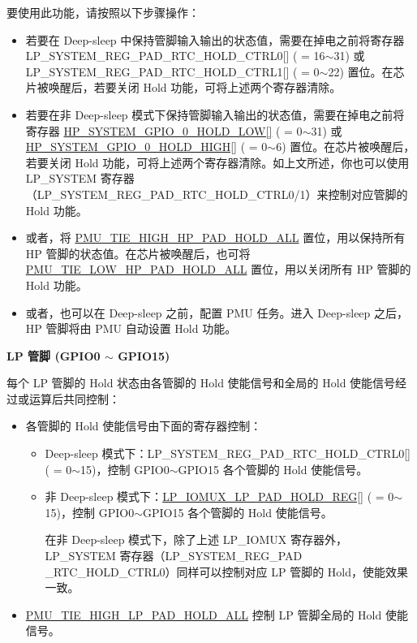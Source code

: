 \documentclass[main\_\_CN.tex]{subfiles}
\begin{document}
{要使用此功能，请按照以下步骤操作：
\begin{itemize}
        \item 若要在 Deep-sleep 中保持管脚输入输出的状态值，需要在掉电之前将寄存器 LP\_SYSTEM\_REG\_PAD\_RTC\_HOLD\_CTRL0[] ( = 16$\sim$31) 或 LP\_SYSTEM\_REG\_PAD\_RTC\_HOLD\_CTRL1[] ( = 0$\sim$22) 置位。在芯片被唤醒后，若要关闭 Hold 功能，可将上述两个寄存器清除。 
        \item 若要在非 Deep-sleep 模式下保持管脚输入输出的状态值，需要在掉电之前将寄存器 \hyperref[fielddesc:HPSYSTEMGPIO0HOLDLOW]{HP\_SYSTEM\_GPIO\_0\_HOLD\_LOW[]} ( = 0$\sim$31) 或 \hyperref[fielddesc:HPSYSTEMGPIO0HOLDHIGH]{HP\_SYSTEM\_GPIO\_0\_HOLD\_HIGH[]} ( = 0$\sim$6) 置位。在芯片被唤醒后，若要关闭 Hold 功能，可将上述两个寄存器清除。如上文所述，你也可以使用 LP\_SYSTEM 寄存器（LP\_SYSTEM\_REG\_PAD\_RTC\_HOLD\_CTRL0/1）来控制对应管脚的 Hold 功能。
        \item 或者，将 \hyperref[fielddesc:PMUTIEHIGHHPPADHOLDALL]{PMU\_TIE\_HIGH\_HP\_PAD\_HOLD\_ALL} 置位，用以保持所有 HP 管脚的状态值。在芯片被唤醒后，也可将 \hyperref[fielddesc:PMUTIELOWHPPADHOLDALL]{PMU\_TIE\_LOW\_HP\_PAD\_HOLD\_ALL} 置位，用以关闭所有 HP 管脚的 Hold 功能。
        \item 或者，也可以在 Deep-sleep 之前，配置 PMU 任务。进入 Deep-sleep 之后，HP 管脚将由 PMU 自动设置 Hold 功能。
    \end{itemize}

\textbf{LP 管脚 (GPIO0 $\sim$ GPIO15)}

每个 LP 管脚的 Hold 状态由各管脚的 Hold 使能信号和全局的 Hold 使能信号经过或运算后共同控制：
\begin{itemize}
    \item 各管脚的 Hold 使能信号由下面的寄存器控制：
    \begin{itemize}
        \item Deep-sleep 模式下：LP\_SYSTEM\_REG\_PAD\_RTC\_HOLD\_CTRL0[] ( = 0$\sim$15)，控制 GPIO0$\sim$GPIO15 各个管脚的 Hold 使能信号。
        \item 非 Deep-sleep 模式下：\hyperref[regdesc:LPIOMUXLPPADHOLDREG]{LP\_IOMUX\_LP\_PAD\_HOLD\_REG[]}  ( = 0$\sim$15)，控制 GPIO0$\sim$GPIO15 各个管脚的 Hold 使能信号。
        \begin{tiplisting}
            在非 Deep-sleep 模式下，除了上述 LP\_IOMUX 寄存器外，LP\_SYSTEM 寄存器（LP\_SYSTEM\_REG\_PAD\\\_RTC\_HOLD\_CTRL0）同样可以控制对应 LP 管脚的 Hold，使能效果一致。
        \end{tiplisting}
    \end{itemize}
    \item \hyperref[fielddesc:PMUTIEHIGHLPPADHOLDALL]{PMU\_TIE\_HIGH\_LP\_PAD\_HOLD\_ALL} 控制 LP 管脚全局的 Hold 使能信号。
\end{itemize}

}
\end{document}

